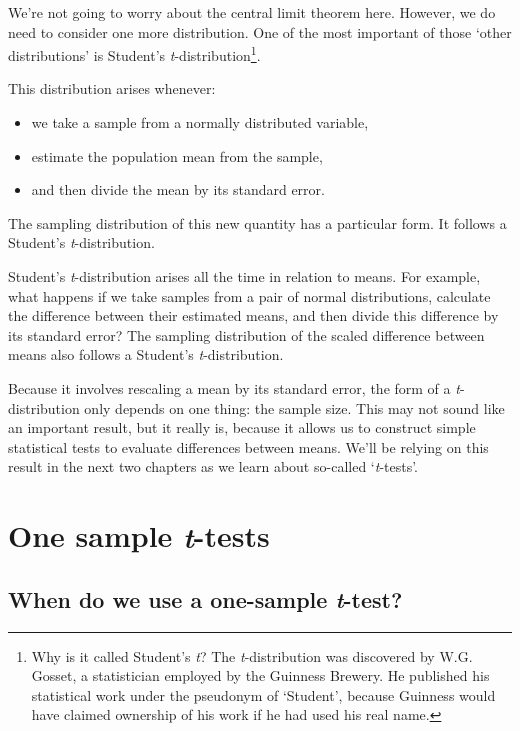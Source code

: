 \documentclass[
]{book}
\providecommand{\tightlist}{%
  \setlength{\itemsep}{0pt}\setlength{\parskip}{0pt}}
\begin{document}
We're not going to worry about the central limit theorem here. However, we do need to consider one more distribution. One of the most important of those `other distributions' is Student's \emph{t}-distribution\footnote{Why is it called Student's \emph{t}? The \emph{t}-distribution was discovered by W.G. Gosset, a statistician employed by the Guinness Brewery. He published his statistical work under the pseudonym of `Student', because Guinness would have claimed ownership of his work if he had used his real name.}.

This distribution arises whenever:

\begin{itemize}
\tightlist
\item
  we take a sample from a normally distributed variable,
\item
  estimate the population mean from the sample,
\item
  and then divide the mean by its standard error.
\end{itemize}

The sampling distribution of this new quantity has a particular form. It follows a Student's \emph{t}-distribution.

Student's \emph{t}-distribution arises all the time in relation to means. For example, what happens if we take samples from a pair of normal distributions, calculate the difference between their estimated means, and then divide this difference by its standard error? The sampling distribution of the scaled difference between means also follows a Student's \emph{t}-distribution.

Because it involves rescaling a mean by its standard error, the form of a \emph{t}-distribution only depends on one thing: the sample size. This may not sound like an important result, but it really is, because it allows us to construct simple statistical tests to evaluate differences between means. We'll be relying on this result in the next two chapters as we learn about so-called `\emph{t}-tests'.

\hypertarget{one-sample-t-tests}{%
\chapter{\texorpdfstring{One sample \emph{t}-tests}{One sample t-tests}}\label{one-sample-t-tests}}

\hypertarget{when-do-we-use-a-one-sample-t-test}{%
\section{\texorpdfstring{When do we use a one-sample \emph{t}-test?}{When do we use a one-sample t-test?}}\label{when-do-we-use-a-one-sample-t-test}}
\end{document}
